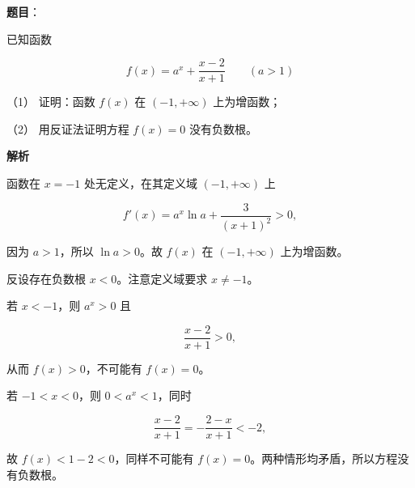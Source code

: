 \begin{answer}

\textbf{题目}：

已知函数

\nopagebreak[4]
\[
f(x)=a^x+\frac{x-2}{x+1}\qquad(a>1)
\]

（1） 证明：函数 $f(x)$ 在 $(-1,+\infty)$ 上为增函数；

（2） 用反证法证明方程 $f(x)=0$ 没有负数根。

\textbf{解析}


函数在 $x=-1$ 处无定义，在其定义域 $(-1,+\infty)$ 上

\nopagebreak[4]
\[
f'(x)=a^x\ln a+\frac3{(x+1)^2}>0,
\]

因为 $a>1$，所以 $\ln a>0$。故 $f(x)$ 在 $(-1,+\infty)$ 上为增函数。


反设存在负数根 $x<0$。注意定义域要求 $x\ne-1$。

若 $x<-1$，则 $a^x>0$ 且

\nopagebreak[4]
\[
\frac{x-2}{x+1}>0,
\]

从而 $f(x)>0$，不可能有 $f(x)=0$。

若 $-1<x<0$，则 $0<a^x<1$，同时

\nopagebreak[4]
\[
\frac{x-2}{x+1}
=-\frac{2-x}{x+1}<-2,
\]

故 $f(x)<1-2<0$，同样不可能有 $f(x)=0$。两种情形均矛盾，所以方程没有负数根。



\end{answer}
